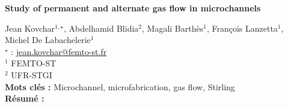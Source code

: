 


    \newpage

\BgThispage

%
\begin{flushleft}
\addtocounter{section}{1}
{\Large \textbf{Study of permanent and alternate gas flow in microchannels}}\label{ref:83}
\end{flushleft}
%
Jean Kovchar$^{1,\star}$, Abdelhamid Blidia$^{2}$, Magali Barthès$^{1}$, François Lanzetta$^{1}$, Michel De Labachelerie$^{1}$\\[2mm]
$^{\star}$ \Letter : \url{jean.kovchar@femto-st.fr}\\[2mm]
{\footnotesize $^{1}$ FEMTO-ST}\\
{\footnotesize $^{2}$ UFR-STGI}\\
[4mm]
%
\noindent \textbf{Mots clés : } Microchannel, microfabrication, gas flow, Stirling\\[4mm]
%
\noindent \textbf{Résumé : } 

